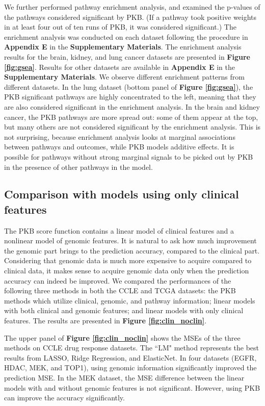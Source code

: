 \documentclass[a4paper,12pt]{article}
\begin{document}
We further performed pathway enrichment analysis, and examined the p-values of the pathways considered significant by PKB. (If a pathway took positive weights in at least four out of ten runs of PKB, it was considered significant.) The enrichment analysis was conducted on each dataset following the procedure in \textbf{Appendix E} in the \textbf{Supplementary Materials}.
The enrichment analysis results for the brain, kidney, and lung cancer datasets are presented in \textbf{Figure \ref{fig:gsea}}. Results for other datasets are available in \textbf{Appendix E} in the \textbf{Supplementary Materials}. We observe different enrichment patterns from different datasets. In the lung dataset (bottom panel of \textbf{Figure \ref{fig:gsea}}), the PKB significant pathways are highly concentrated to the left, meaning that they are also considered significant in the enrichment analysis. In the brain and kidney cancer, the PKB pathways are more spread out: some of them appear at the top, but many others are not considered significant by the enrichment analysis. This is not surprising, because enrichment analysis looks at marginal associations between pathways and outcomes, while PKB models additive effects. It is possible for pathways without strong marginal signals to be picked out by PKB in the presence of other pathways in the model.


\subsection{Comparison with models using only clinical features}

The PKB score function contains a linear model of clinical features and a nonlinear model of genomic features. It is natural to ask how much improvement the genomic part brings to the prediction accuracy, compared to the clinical part. Considering that genomic data is much more expensive to acquire compared to clinical data, it makes sense to acquire genomic data only when the prediction accuracy can indeed be improved. We compared the performances of the following three methods in both the CCLE and TCGA datasets: the PKB methods which utilize clinical, genomic, and pathway information; linear models with both clinical and genomic features; and linear models with only clinical features. The results are presented in \textbf{Figure \ref{fig:clin_noclin}}. 

The upper panel of \textbf{Figure \ref{fig:clin_noclin}} shows the MSEs of the three methods on CCLE drug response datasets. The ``LM" method represents the best results from LASSO, Ridge Regression, and ElasticNet. In four datasets (EGFR, HDAC, MEK, and TOP1), using genomic information significantly improved the prediction MSE. In the MEK dataset, the MSE difference between the linear models with and without genomic features is not significant. However, using PKB can improve the accuracy significantly.
\end{document}
